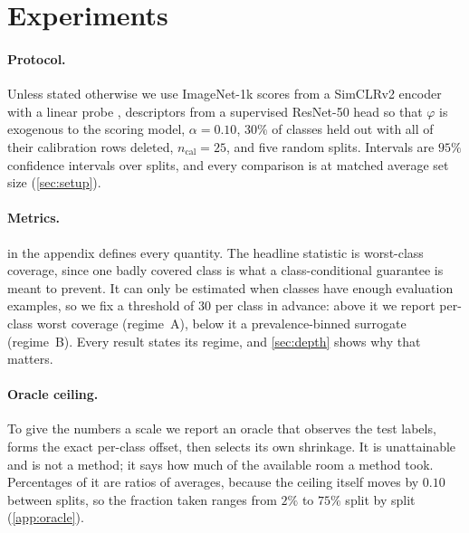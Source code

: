 \section{Experiments}
\label{sec:exp}

\paragraph{Protocol.} Unless stated otherwise we use ImageNet-1k
\cite{russakovsky2015imagenet} scores from a SimCLRv2 encoder with a linear probe
\cite{chen2020big}, descriptors from a supervised ResNet-50 head \cite{he2016deep} so that
$\varphi$ is exogenous to the scoring model, $\alpha=0.10$, $30\%$ of classes held out with
all of their calibration rows deleted, $n_{\mathrm{cal}}=25$, and five random splits.
Intervals are $95\%$ confidence intervals over splits, and every comparison is at matched
average set size (\cref{sec:setup}).

\paragraph{Metrics.}  in the appendix defines every quantity. The headline
statistic is worst-class coverage, since one badly covered class is what a class-conditional
guarantee is meant to prevent. It can only be estimated when classes have enough evaluation
examples, so we fix a threshold of $30$ per class in advance: above it we report per-class
worst coverage (regime~A), below it a prevalence-binned surrogate (regime~B). Every result
states its regime, and \cref{sec:depth} shows why that matters.

\paragraph{Oracle ceiling.} To give the numbers a scale we report an oracle that observes the
test labels, forms the exact per-class offset, then selects its own shrinkage. It is
unattainable and is not a method; it says how much of the available room a method took.
Percentages of it are ratios of averages, because the ceiling itself moves by $0.10$ between
splits, so the fraction taken ranges from $2\%$ to $75\%$ split by split (\cref{app:oracle}).

